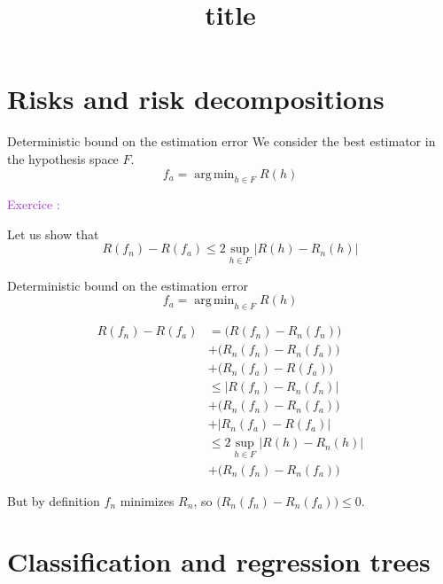 \documentclass[usenames,dvipsnames]{beamer}
\title[FTML]{title}
\date{} %
\DeclareMathOperator*{\argmin}{arg\,min}
\newcounter{numexos}%
\newcommand{\exercice}[1]{%
\addtocounter{numexos}{1}%
\textcolor{DarkOrchid}{Exercice\,\thenumexos\,:}\,#1%
}
\begin{document}
\begin{frame}
\titlepage %
\end{frame}

\section{Risks and risk decompositions}
\frame{\tableofcontents[currentsection]}

\begin{frame}{Deterministic bound on the estimation error}
We consider the best estimator in the hypothesis space $F$.
    \begin{equation*}
	f_a = \argmin_{h\in F}R(h)
    \end{equation*}

    \exercice{}
    Let us show that
    \begin{equation}
	R( f_n)-R(f_a) \leq 2 \sup_{h\in F}|R(h)-R_n(h)|
    \end{equation}
\end{frame}

\begin{frame}{Deterministic bound on the estimation error}
    \begin{equation*}
	f_a = \argmin_{h\in F}R(h)
    \end{equation*}

    \begin{equation}
        \begin{aligned}
	    R(f_n)-R(f_a) &= \big(R(f_n)-R_n( f_n)\big)\\
	    &+\big(R_n(f_n)- R_n(f_a)\big)\\
	    &+\big(R_n(f_a)-R(f_a)\big)\\
	    &\leq | R(f_n)- R_n(f_n) |\\
	    &+\big(R_n(f_n)-R_n(f_a)\big)\\
	    &+ | R_n(f_a)-R(f_a) | \\
	    &\leq 2 \sup_{h\in F}|R(h)-R_n(h)|\\
	    &+\big(R_n(f_n)-R_n(f_a)\big)
        \end{aligned}
    \end{equation}

    But by definition $ f_n$ minimizes $R_n$, so $ \big( R_n ( f_n)-R_n(f_a)\big)\leq 0$.
\end{frame}

\section{Classification and regression trees}
\frame{\tableofcontents[currentsection]}
\end{document}
